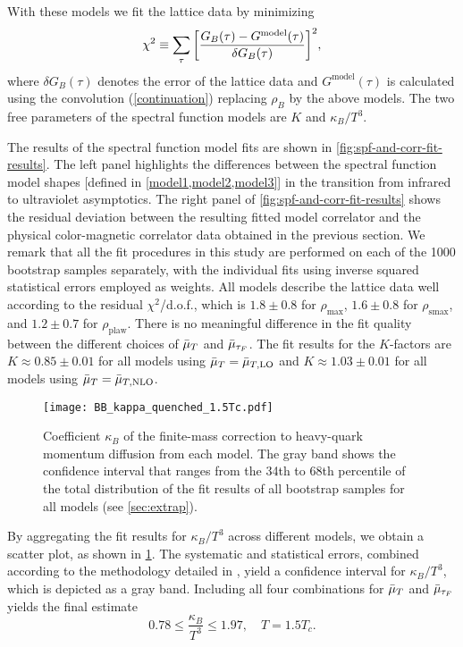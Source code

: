 \documentclass[floatfix,twocolumn,prd,showpacs,preprintnumbers,amsmath,nofootinbib,amssymb,superscriptaddress]{revtex4-2}
\begin{document}
With these models we fit the lattice data by minimizing
\begin{align}
\chi^2\equiv\sum_{\tau}\bigg{[}\frac{G_B(\tau)-G^\textrm{model}(\tau)}{\delta G_B(\tau)}\bigg{]}^2,
\end{align}
where $\delta G_B(\tau)$ denotes the error of the lattice data and $G^\textrm{model}(\tau)$ is calculated using the convolution (\cref{continuation}) replacing $\rho_B$ by the above models. The two free parameters of the spectral function models are $K$ and $\kappa_B/T^3$.

The results of the spectral function model fits are shown in \cref{fig:spf-and-corr-fit-results}. The left panel highlights the differences between the spectral function model shapes [defined in \cref{model1,model2,model3}] in the transition from infrared to ultraviolet asymptotics. The right panel of \cref{fig:spf-and-corr-fit-results} shows the residual deviation between the resulting fitted model correlator and the physical color-magnetic correlator data obtained in the previous section.
We remark that all the fit procedures in this study are performed on each of the 1000 bootstrap samples separately, with the individual fits using inverse squared statistical errors employed as weights.
All models describe the lattice data well according to the residual $\chi^2$/d.o.f., which is $1.8\pm0.8$ for $\rho_\mathrm{max}$, $1.6\pm0.8$ for $\rho_\mathrm{smax}$, and $1.2\pm0.7$ for $\rho_\mathrm{plaw}$. There is no meaningful difference in the fit quality between the different choices of $\bar{\mu}_{T}$ and $\bar{\mu}_{\tau_F}$. The fit results for the $K$-factors are $K\approx 0.85\pm0.01$ for all models using $\bar{\mu}_{T}=\bar{\mu}_{T,\mathrm{LO}}$ and  $K\approx 1.03 \pm 0.01$ for all models using $\bar{\mu}_{T}=\bar{\mu}_{T,\mathrm{NLO}}$.

\begin{figure}[b]
    \centering
    \texttt{[image: BB\_kappa\_quenched\_1.5Tc.pdf]}
    \caption{Coefficient $\kappa_B$ of the finite-mass correction to heavy-quark momentum diffusion from each model. 
    The gray band shows the confidence interval that ranges from the 34th to 68th percentile of the total distribution of the fit results of all bootstrap samples for all models (see \cref{sec:extrap}).}
    \label{fig:scattering}
\end{figure}

By aggregating the fit results for $\kappa_B/T^3$ across different models, we obtain a scatter plot, as shown in \cref{fig:scattering}. The systematic and statistical errors, combined according to the methodology detailed in \cite{Altenkort:2023oms}, yield a confidence interval for $\kappa_B/T^3$, which is depicted as a gray band.
Including all four combinations for $\bar{\mu}_{T}$ and $\bar{\mu}_{\tau_F}$ yields the final estimate
\begin{equation}
    0.78\leq \frac{\kappa_B}{T^3}\leq 1.97, \quad T=1.5T_c.
\end{equation}
\end{document}
